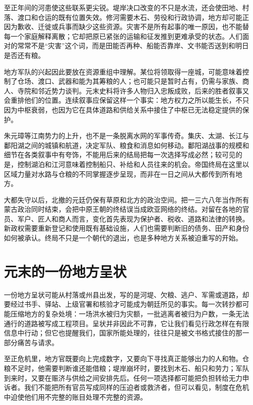 至正年间的河患使这些联系更尖锐。堤岸决口改变的不只是水流，还会使田地、村落、渡口和仓运的既有位置失效。修河需要木石、劳役和行政协调，地方却可能正因为歉收、迁徙或兵事而缺少这些资源。灾害不是所有起事的唯一原因，也不能替每一个家庭解释离散；它却把原已紧张的运输和征发推到更难承受的状态。人们面对的常常不是“灾害”这个词，而是田能否再种、船能否靠岸、文书能否送到和明日是否还有粮。

地方军队的兴起因此要放在资源重组中理解。某位将领取得一座城，可能意味着控制了仓场、渡口、武器和能为其筹粮的人；也可能只是暂时占有，仍需与家族、商人、寺院和邻近势力谈判。元末史料将许多人物归入忠叛成败，后来的胜者叙事又会重排他们的位置。连续叙事应保留这样一个事实：地方权力之所以能生长，不只因为中枢衰弱，也因为它在具体道路和供给关系中接住了中枢已无法稳定提供的保护。

朱元璋等江南势力的上升，也不是一条脱离水网的军事传奇。集庆、太湖、长江与鄱阳湖之间的城镇和航道，决定军队、粮食和消息如何移动。鄱阳湖战事的规模和细节在各类叙事中有夸饰，不能用后来的结局把每一次选择写成必然；较可见的是，控制湖泊和江河意味着控制船只、补给和人员往来的机会。帝国终局在这里以区域力量对水路与仓粮的不同掌握逐步呈现，而非在一日之间从大都传到所有地方。

大都失守以后，北撤的元廷仍保有草原和北方的政治空间。把一三六八年当作所有蒙古政治同时结束，会把中原王朝的终结误当成欧亚网络的终结。对留在各地的官员、军户、匠人和商人而言，变化首先表现为保护者、税收、道路和法律的转换。新政权需要重新登记和使用既有基础设施，人们也需要判断旧的债务、田产和身份如何被承认。终局不只是一个朝代的退出，也是多种地方关系被迫重写的开始。

\section{元末的一份地方呈状}

一份地方呈状可能从村落或州县出发，写的是河堤、欠粮、逃户、军需或道路，却要经过书手、驿站、上级官署和核验才可能成为朝廷所见的事实。每一次转抄都可能压缩地方的复杂处境：一场洪水被归为灾额，一批逃离者被归为户数，一条无法通行的道路被写成工程项目。呈状并非因此不可靠，它让我们看见行政怎样在有限信息中行动；但它也提醒我们，国家所能处理的，往往只是被文书格式接住的那一部分痛苦与请求。

至正危机里，地方官既要向上完成数字，又要向下寻找真正能够出力的人和物。仓粮不足时，他需要判断谁还能借粮；堤岸崩坏时，要找到木石、船只和劳力；军队到来时，又要在赈济与供给之间安排先后。任何一项选择都可能把负担转给无力申诉者。我们不能把所有官员写成同样的压迫者或救济者，但可以看见，制度在危机中迫使他们用不完整的账目处理不完整的资源。

